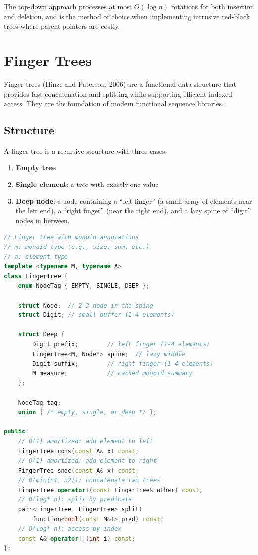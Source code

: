 The top-down approach processes at most $O(\log n)$ rotations for both insertion and deletion, and is the method of choice when implementing intrusive red-black trees where parent pointers are costly.

\section{Finger Trees}
\label{sec:finger-trees}

Finger trees (Hinze and Paterson, 2006) are a functional data structure that provides fast concatenation and splitting while supporting efficient indexed access. They are the foundation of modern functional sequence libraries.

\subsection{Structure}
\label{sec:finger-structure}

A finger tree is a recursive structure with three cases:

\begin{enumerate}
    \item \textbf{Empty tree}
    \item \textbf{Single element}: a tree with exactly one value
    \item \textbf{Deep node}: a node containing a ``left finger'' (a small array of elements near the left end), a ``right finger'' (near the right end), and a lazy spine of ``digit'' nodes in between.
\end{enumerate}

\begin{lstlisting}[language=C++]
// Finger tree with monoid annotations
// m: monoid type (e.g., size, sum, etc.)
// a: element type
template <typename M, typename A>
class FingerTree {
    enum NodeTag { EMPTY, SINGLE, DEEP };

    struct Node;  // 2-3 node in the spine
    struct Digit; // small buffer (1-4 elements)

    struct Deep {
        Digit prefix;        // left finger (1-4 elements)
        FingerTree<M, Node*> spine;  // lazy middle
        Digit suffix;        // right finger (1-4 elements)
        M measure;           // cached monoid summary
    };

    NodeTag tag;
    union { /* empty, single, or deep */ };

public:
    // O(1) amortized: add element to left
    FingerTree cons(const A& x) const;
    // O(1) amortized: add element to right
    FingerTree snoc(const A& x) const;
    // O(min(n1, n2)): concatenate two trees
    FingerTree operator+(const FingerTree& other) const;
    // O(log* n): split by predicate
    pair<FingerTree, FingerTree> split(
        function<bool(const M&)> pred) const;
    // O(log* n): access by index
    const A& operator[](int i) const;
};
\end{lstlisting}

